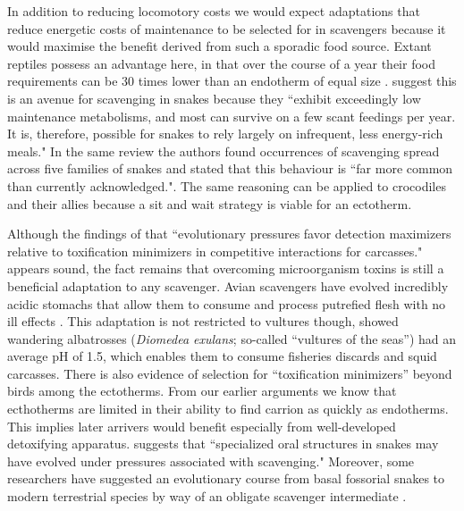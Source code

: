\documentclass[a4paper,12pt]{article}
\begin{document}
In addition to reducing locomotory costs we would expect adaptations that reduce energetic costs of maintenance to be selected for in scavengers because it would maximise the benefit derived from such a sporadic food source. 
Extant reptiles possess an advantage here, in that over the course of a year their food requirements can be 30 times lower than an endotherm of equal size \citep{Nagy1621}.
\cite{devault2002scavenging} suggest this is an avenue for scavenging in snakes because they ``exhibit exceedingly low maintenance metabolisms, and most can survive on  a few scant feedings per year.
It is, therefore, possible for snakes to rely largely on infrequent, less energy-rich meals."
In the same review the authors found occurrences of scavenging spread across five families of snakes and stated that this behaviour is ``far more common than currently acknowledged."\citep{devault2002scavenging}.
The same reasoning can be applied to crocodiles and their allies \citep{forrest2003evidence} because a sit and wait strategy is viable for an ectotherm. 
%

Although the findings of \cite{shivik2006vultures} that ``evolutionary pressures favor detection maximizers relative to toxification minimizers in competitive interactions for carcasses." appears sound, the fact remains that overcoming microorganism toxins is still a beneficial adaptation to any scavenger. 
Avian scavengers have evolved incredibly acidic stomachs that allow them to consume and process putrefied flesh with no ill effects \citep{houston1975digestive,roggenbuck2014microbiome}. 
This adaptation is not restricted to vultures though, \cite{gremillet2012vultures} showed wandering albatrosses (\textit{Diomedea exulans}; so-called ``vultures of the seas'') had an average pH of 1.5, which enables them to consume fisheries discards and squid carcasses. 
There is also evidence of selection for ``toxification minimizers'' beyond birds among the ectotherms.
From our earlier arguments we know that ecthotherms are limited in their ability to find carrion as quickly as endotherms. 
This implies later arrivers would benefit especially from well-developed detoxifying apparatus. 
\cite{shivik2006vultures} suggests that ``specialized oral structures in snakes may have evolved under pressures associated with scavenging."
Moreover, some researchers have suggested an evolutionary course from basal fossorial snakes to modern terrestrial species by way of an obligate scavenger intermediate \citep{bauchot2006snakes}. 
\end{document}

